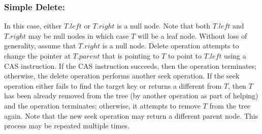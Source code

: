 \subsubsection{Simple Delete:}
	In this case, either $T.left$ or $T.right$ is a null node. Note that both $T.left$ and $T.right$ may be null nodes in which case $T$ will be a leaf node. Without loss of generality, assume that $T.right$ is a null node. Delete operation attempts to change the pointer at $T.parent$ that is pointing to $T$ to point to $T.left$ using a CAS instruction. If the CAS instruction succeeds, then the operation terminates; otherwise, the delete operation performs another seek operation. If the seek operation either fails to find the target key or returns a \terminalnode \space different from $T$, then $T$ has been already removed from the tree (by another operation as part of helping) and the operation terminates; otherwise, it attempts to remove $T$ from the tree again. Note that the new seek operation may return a different parent node. This process may be repeated multiple times.


